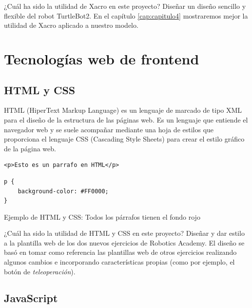 ¿Cuál ha sido la utilidad de Xacro en este proyecto? Diseñar un diseño sencillo y flexible del robot TurtleBot2. En el capítulo \ref{cap:capitulo4} mostraremos mejor la utilidad de Xacro aplicado a nuestro modelo.\\



\section{Tecnologías web de frontend}
\label{sec:tecnologias_frontend}

\subsection{HTML y CSS}
\label{subsec:html_css}

HTML (HiperText Markup Language) es un lenguaje de marcado de tipo XML para el diseño de la estructura de las páginas web. Es un lenguaje que entiende el navegador web y se suele acompañar mediante una hoja de estilos que proporciona el lenguaje CSS (Cascading Style Sheets) para crear el estilo gráfico de la página web.\\


\begin{code}[H]
\begin{lstlisting}
<p>Esto es un parrafo en HTML</p>
\end{lstlisting}
\begin{lstlisting}
p {
	background-color: #FF0000;
}
\end{lstlisting}
\caption[Ejemplo de HTML y CSS]{Ejemplo de HTML y CSS: Todos los párrafos tienen el fondo rojo}
\label{cod:codigo_urdf}
\end{code}

¿Cuál ha sido la utilidad de HTML y CSS en este proyecto? Diseñar y dar estilo a la plantilla web de los dos nuevos ejercicios de Robotics Academy. El diseño se basó en tomar como referencia las plantillas web de otros ejercicios realizando algunos cambios e incorporando características propias (como por ejemplo, el botón de \textit{teleoperación}).\\




\subsection{JavaScript}
\label{subsec:JavaScript}

